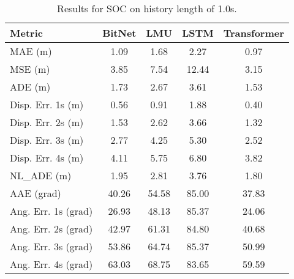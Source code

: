 \begin{table}[H]
\centering
\caption{Results for SOC on history length of 1.0s.}
\label{hist:SOC_1.0s}
\begin{tabular}{l||c|c|c|c}
Metric & BitNet & LMU & LSTM & Transformer \\
\hline \hline
MAE (m) & 1.09 & 1.68 & 2.27 & 0.97 \\
MSE (m) & 3.85 & 7.54 & 12.44 & 3.15 \\
ADE (m) & 1.73 & 2.67 & 3.61 & 1.53 \\
Disp. Err. 1s (m) & 0.56 & 0.91 & 1.88 & 0.40 \\
Disp. Err. 2s (m) & 1.53 & 2.62 & 3.66 & 1.32 \\
Disp. Err. 3s (m) & 2.77 & 4.25 & 5.30 & 2.52 \\
Disp. Err. 4s (m) & 4.11 & 5.75 & 6.80 & 3.82 \\
NL\_ADE (m) & 1.95 & 2.81 & 3.76 & 1.80 \\
AAE (grad) & 40.26 & 54.58 & 85.00 & 37.83 \\
Ang. Err. 1s (grad) & 26.93 & 48.13 & 85.37 & 24.06 \\
Ang. Err. 2s (grad) & 42.97 & 61.31 & 84.80 & 40.68 \\
Ang. Err. 3s (grad) & 53.86 & 64.74 & 85.37 & 50.99 \\
Ang. Err. 4s (grad) & 63.03 & 68.75 & 83.65 & 59.59 \\
\end{tabular}
\end{table}
